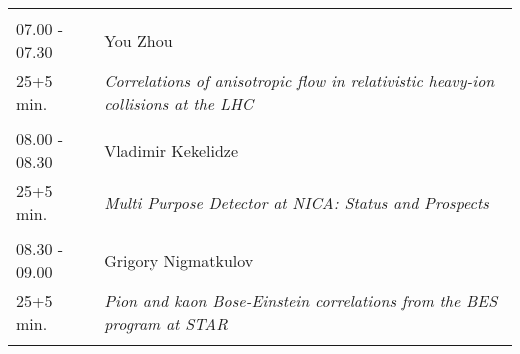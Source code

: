 \begin{longtable}{p{3cm}p{13cm}}
 & \\ 
07.00 - 07.30 & You Zhou\\ 
25+5 min. & {\it Correlations of anisotropic flow in relativistic heavy-ion collisions at the LHC}\\ 
 & \\ 
08.00 - 08.30 & Vladimir Kekelidze\\ 
25+5 min. & {\it Multi Purpose Detector at NICA: Status and Prospects}\\ 
 & \\ 
08.30 - 09.00 & Grigory Nigmatkulov\\ 
25+5 min. & {\it Pion and kaon Bose-Einstein correlations from the BES program at STAR}\\ 
 & \\ 
\end{longtable}

